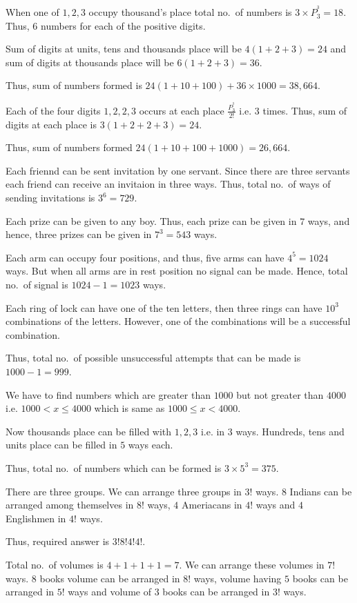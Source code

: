   When one of $1, 2, 3$ occupy thousand's place total no.\ of numbers is $3\times P_3^^3 = 18$. Thus, $6$
  numbers for each of the positive digits.

  Sum of digits at units, tens and thousands place will be $4(1 + 2 + 3) = 24$ and sum of digits at
  thousands place will be $6(1 + 2 + 3) = 36$.

  Thus, sum of numbers formed is $24(1 + 10 + 100) + 36\times 1000 = 38,664$.
\item Each of the four digits $1, 2, 2, 3$ occurs at each place $\frac{P_3^^3}{2!}$ i.e. $3$ times. Thus,
  sum of digits at each place is $3(1 + 2 + 2 + 3) = 24$.

  Thus, sum of numbers formed $24(1 + 10 + 100 + 1000) = 26,664$.
\item Each friennd can be sent invitation by one servant. Since there are three servants each friend can
  receive an invitaion in three ways. Thus, total no.\ of ways of sending invitations is $3^6 = 729$.
\item Each prize can be given to any boy. Thus, each prize can be given in $7$ ways, and hence, three
  prizes can be given in $7^3 = 543$ ways.
\item Each arm can occupy four positions, and thus, five arms can have $4^5 = 1024$ ways. But when all arms
  are in rest position no signal can be made. Hence, total no.\ of signal is $1024 -1 = 1023$ ways.
\item Each ring of lock can have one of the ten letters, then three rings can have $10^3$ combinations of
  the letters. However, one of the combinations will be a successful combination.

  Thus, total no.\ of possible unsuccessful attempts that can be made is $1000 - 1 = 999$.
\item We have to find numbers which are greater than $1000$ but not greater than $4000$ i.e. $1000< x\leq
  4000$ which is same as $1000\leq x < 4000$.

  Now thousands place can be filled with $1, 2, 3$ i.e. in $3$ ways. Hundreds, tens and units place can be
  filled in $5$ ways each.

  Thus, total no.\ of numbers which can be formed is $3\times 5^3 = 375$.
\item There are three groups. We can arrange three groups in $3!$ ways. $8$ Indians can be arranged among
  themselves in $8!$ ways, $4$ Ameriacans in $4!$ ways and $4$ Englishmen in $4!$ ways.

  Thus, required answer is $3!8!4!4!$.
\item Total no.\ of volumes is $4 + 1 + 1 + 1 = 7$. We can arrange these volumes in $7!$ ways. $8$ books
  volume can be arranged in $8!$ ways, volume having $5$ books can be arranged in $5!$ ways and volume of
  $3$ books can be arranged in $3!$ ways.


